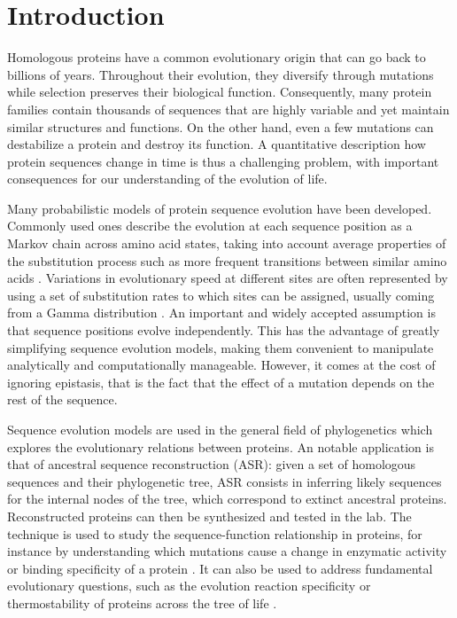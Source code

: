 
\section{Introduction}

Homologous proteins have a common evolutionary origin that can go back to billions of years. 
Throughout their evolution, they diversify through mutations while selection preserves their biological function. 
Consequently, many protein families contain thousands of sequences that are highly variable and yet maintain similar structures and functions. 
On the other hand, even a few mutations can destabilize a protein and destroy its function. 
A quantitative description how protein sequences change in time is thus a challenging problem, with important consequences for our understanding of the evolution of life. 

Many probabilistic models of protein sequence evolution have been developed. 
Commonly used ones describe the evolution at each sequence position as a Markov chain across amino acid states, taking into account average properties of the substitution process such as more frequent transitions between similar amino acids \cite{dayhoff_modelevolutionarychange_1978,henikoff_aminoacidsubstitution_1992,jones_rapidgenerationmutation_1992}. 
Variations in evolutionary speed at different sites are often represented by using a set of substitution rates to which sites can be assigned, usually coming from a Gamma distribution \cite{yang_maximumlikelihoodphylogenetic_1994}.
An important and widely accepted assumption is that sequence positions evolve independently. 
This has the advantage of greatly simplifying sequence evolution models, making them convenient to manipulate analytically and computationally manageable. 
However, it comes at the cost of ignoring epistasis, that is the fact that the effect of a mutation depends on the rest of the sequence. 

Sequence evolution models are used in the general field of phylogenetics which explores the evolutionary relations between proteins. 
An notable application is that of ancestral sequence reconstruction (ASR): given a set of homologous sequences and their phylogenetic tree, ASR consists in inferring likely sequences for the internal nodes of the tree, which correspond to extinct ancestral proteins. 
Reconstructed proteins can then be synthesized and tested in the lab. 
The technique is used to study the sequence-function relationship in proteins, for instance by understanding which mutations cause a change in
enzymatic activity or binding specificity of a protein \cite{wouters_despecializationstepunderlying_2003,voordeckers_reconstructionancestralmetabolic_2012,hochberg_reconstructingancientproteins_2017}. 
It can also be used to address fundamental evolutionary questions, such as the evolution reaction specificity or thermostability of proteins across the tree of life \cite{akanuma_experimentalevidencethermophilicity_2013,hobbs_originevolutionthermophily_2012}. 

